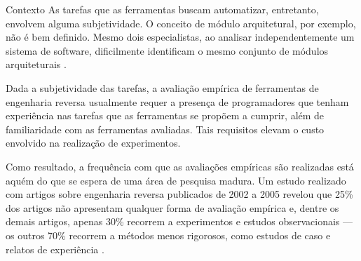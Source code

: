 \begin{section}{Contexto}
	As tarefas que as ferramentas buscam automatizar, entretanto, envolvem alguma subjetividade. O conceito de módulo arquitetural, por exemplo, não é bem definido. Mesmo dois especialistas, ao analisar independentemente um sistema de software, dificilmente identificam o mesmo conjunto de módulos arquiteturais \cite{Koschke2000}. %

	Dada a subjetividade das tarefas, a avaliação empírica de ferramentas de engenharia reversa usualmente requer a presença de programadores que tenham experiência nas tarefas que as ferramentas se propõem a cumprir, além de familiaridade com as ferramentas avaliadas. Tais requisitos elevam o custo envolvido na realização de experimentos. %
	 
	
	
	Como resultado, a frequência com que as avaliações empíricas são realizadas está aquém do que se espera de uma área de pesquisa madura. Um estudo realizado com artigos sobre engenharia reversa publicados de 2002 a 2005 revelou que 25\% dos artigos não apresentam qualquer forma de avaliação empírica e, dentre os demais artigos, apenas 30\% recorrem a experimentos e estudos observacionais --- os outros 70\% recorrem a métodos menos rigorosos, como estudos de caso e relatos de experiência \cite{Tonella2007}.




\end{section}
